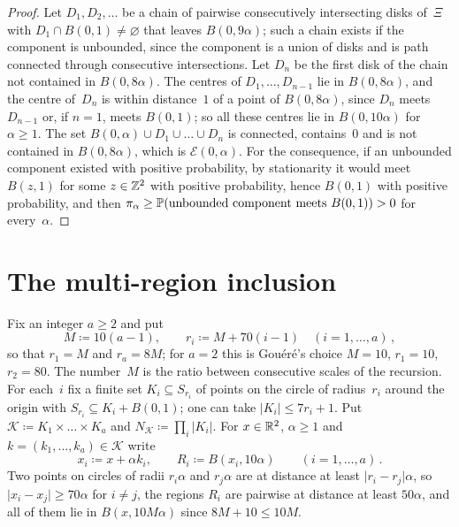 \documentclass[11pt,letterpaper]{article}
\renewcommand{\cE}{\mathcal E}
\begin{document}
\begin{proof}
Let $D_1,D_2,\dots$ be a chain of pairwise consecutively intersecting disks of~$\Xi$ with $D_1\cap B(0,1)\neq\varnothing$ that leaves $B(0,9\alpha)$; such a chain exists if the component is unbounded, since the component is a union of disks and is path connected through consecutive intersections. Let $D_n$ be the first disk of the chain not contained in $B(0,8\alpha)$. The centres of $D_1,\dots,D_{n-1}$ lie in $B(0,8\alpha)$, and the centre of~$D_n$ is within distance~$1$ of a point of $B(0,8\alpha)$, since $D_n$ meets $D_{n-1}$ or, if $n=1$, meets $B(0,1)$; so all these centres lie in $B(0,10\alpha)$ for $\alpha\ge1$. The set $B(0,\alpha)\cup D_1\cup\dots\cup D_n$ is connected, contains~$0$ and is not contained in $B(0,8\alpha)$, which is $\cE(0,\alpha)$. For the consequence, if an unbounded component existed with positive probability, by stationarity it would meet $B(z,1)$ for some $z\in\Z^2$ with positive probability, hence $B(0,1)$ with positive probability, and then $\pi_\alpha\ge\P(\text{unbounded component meets }B(0,1))>0$ for every~$\alpha$.
\end{proof}

\section{The multi-region inclusion}
\label{sec:inclusion}

Fix an integer $a\ge2$ and put
\begin{equation}
\label{eq:M}
  M\coloneqq10(a-1),\qquad r_i\coloneqq M+70(i-1)\quad(i=1,\dots,a)\,,
\end{equation}
so that $r_1=M$ and $r_a=8M$; for $a=2$ this is Gou\'er\'e's choice $M=10$, $r_1=10$, $r_2=80$. The number~$M$ is the ratio between consecutive scales of the recursion. For each~$i$ fix a finite set $K_i\subseteq S_{r_i}$ of points on the circle of radius~$r_i$ around the origin with $S_{r_i}\subseteq K_i+B(0,1)$; one can take $\lvert K_i\rvert\le7r_i+1$. Put $\mathcal K\coloneqq K_1\times\dots\times K_a$ and $N_{\mathcal K}\coloneqq\prod_i\lvert K_i\rvert$. For $x\in\R^2$, $\alpha\ge1$ and $k=(k_1,\dots,k_a)\in\mathcal K$ write
\begin{equation*}
  x_i\coloneqq x+\alpha k_i,\qquad R_i\coloneqq B(x_i,10\alpha)\qquad(i=1,\dots,a)\,.
\end{equation*}
Two points on circles of radii $r_i\alpha$ and $r_j\alpha$ are at distance at least $\lvert r_i-r_j\rvert\alpha$, so $\lvert x_i-x_j\rvert\ge70\alpha$ for $i\neq j$, the regions $R_i$ are pairwise at distance at least $50\alpha$, and all of them lie in $B(x,10M\alpha)$ since $8M+10\le10M$.
\end{document}
